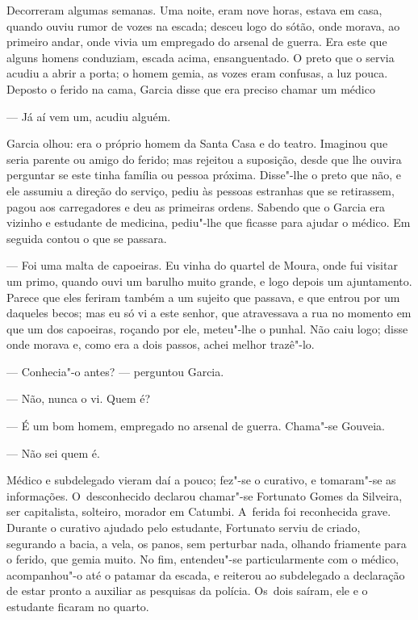 \begin{linenumbers}
Decorreram algumas semanas. Uma noite, eram nove horas, estava em casa,
quando ouviu rumor de vozes na escada; desceu logo do sótão, onde
morava, ao primeiro andar, onde vivia um empregado do arsenal de guerra.
Era este que alguns homens conduziam, escada acima, ensanguentado. O
preto que o servia acudiu a abrir a porta; o homem gemia, as vozes eram
confusas, a luz pouca. Deposto o ferido na cama, Garcia disse que era
preciso chamar um médico

--- Já aí vem um, acudiu alguém.

Garcia olhou: era o próprio homem da Santa Casa e do teatro. Imaginou
que seria parente ou amigo do ferido; mas rejeitou a suposição, desde
que lhe ouvira perguntar se este tinha família ou pessoa próxima.
Disse"-lhe o preto que não, e ele assumiu a direção do serviço, pediu às
pessoas estranhas que se retirassem, pagou aos carregadores e deu as
primeiras ordens. Sabendo que o Garcia era vizinho e estudante de
medicina, pediu"-lhe que ficasse para ajudar o médico. Em seguida contou
o que se passara.

--- Foi uma malta de capoeiras. Eu vinha do quartel de Moura, onde fui
visitar um primo, quando ouvi um barulho muito grande, e logo depois um
ajuntamento. Parece que eles feriram também a um sujeito que passava, e
que entrou por um daqueles becos; mas eu só vi a este senhor, que
atravessava a rua no momento em que um dos capoeiras, roçando por ele,
meteu"-lhe o punhal. Não caiu logo; disse onde morava e, como era a dois
passos, achei melhor trazê"-lo.

--- Conhecia"-o antes? --- perguntou Garcia.

--- Não, nunca o vi. Quem é?

--- É um bom homem, empregado no arsenal de guerra. Chama"-se Gouveia.

--- Não sei quem é.

Médico e subdelegado vieram daí a pouco; fez"-se o curativo, e tomaram"-se
as informações. O~desconhecido declarou chamar"-se Fortunato Gomes da
Silveira, ser capitalista, solteiro, morador em Catumbi. A~ferida foi
reconhecida grave. Durante o curativo ajudado pelo estudante, Fortunato
serviu de criado, segurando a bacia, a vela, os panos, sem perturbar
nada, olhando friamente para o ferido, que gemia muito. No fim,
entendeu"-se particularmente com o médico, acompanhou"-o até o patamar da
escada, e reiterou ao subdelegado a declaração de estar pronto a
auxiliar as pesquisas da polícia. Os~dois saíram, ele e o estudante
ficaram no quarto.


\end{linenumbers}
